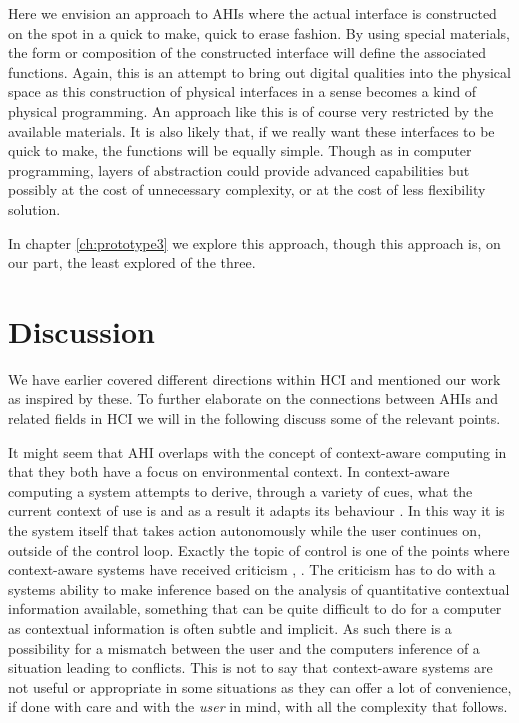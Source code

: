Here we envision an approach to AHIs where the actual interface is constructed on the spot in a quick to make, quick to erase fashion.
By using special materials, the form or composition of the constructed interface will define the associated functions.
Again, this is an attempt to bring out digital qualities into the physical space as this construction of physical interfaces in a sense becomes a kind of physical programming.
An approach like this is of course very restricted by the available materials.
It is also likely that, if we really want these interfaces to be quick to make, the functions will be equally simple.
Though as in computer programming, layers of abstraction could provide advanced capabilities but possibly at the cost of unnecessary complexity, or at the cost of less flexibility solution.

In chapter \ref{ch:prototype3} we explore this approach, though this approach is, on our part, the least explored of the three.

\section{Discussion} 

We have earlier covered different directions within HCI and mentioned our work as inspired by these.
To further elaborate on the connections between AHIs and related fields in HCI we will in the following discuss some of the relevant points.

It might seem that AHI overlaps with the concept of context-aware computing in that they both have a focus on environmental context.
In context-aware computing a system attempts to derive, through a variety of cues, what the current context of use is and as a result it adapts its behaviour \citep[chap. 8]{krumm2009ubiquitous}. 
In this way it is the system itself that takes action autonomously while the user continues on, outside of the control loop.
Exactly the topic of control is one of the points where context-aware systems have received criticism \cite{erickson2002some}, \citep[chap. 8]{krumm2009ubiquitous}.
The criticism has to do with a systems ability to make inference based on the analysis of quantitative contextual information available, something that can be quite difficult to do for a computer as contextual information is often subtle and implicit.
As such there is a possibility for a mismatch between the user and the computers inference of a situation leading to conflicts.
This is not to say that context-aware systems are not useful or appropriate in some situations as they can offer a lot of convenience, if done with care and with the \emph{user} in mind, with all the complexity that follows.

